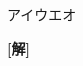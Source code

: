 \documentclass[a4j]{jarticle}
\begin{document}

\preEqlabel{$\cdots$}
     \begin{oframed}
アイウエオ
          \end{oframed}

	  \setlength{\columnseprule}{0.4pt}
	  \begin{multicols}{2}
	  {\bf[解]}

	  \newpage
	  \end{multicols}
	  
\end{document}
